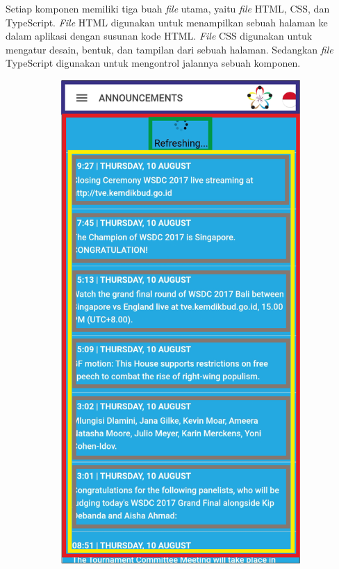 Setiap komponen memiliki tiga buah \textit{file} utama, yaitu \textit{file} HTML, CSS, dan TypeScript. \textit{File} HTML digunakan untuk menampilkan sebuah halaman ke dalam aplikasi dengan susunan kode HTML. \textit{File} CSS digunakan untuk mengatur desain, bentuk, dan tampilan dari sebuah halaman. Sedangkan \textit{file} TypeScript digunakan untuk mengontrol jalannya sebuah komponen.

\begin{figure}[H]
     \centering
     \begin{subfigure}[b]{0.247\textwidth}
        \centering
	    \includegraphics[scale=0.37]{Gambar/AnnouncementsPageWireframe.png}

\end{subfigure}
\end{figure}
